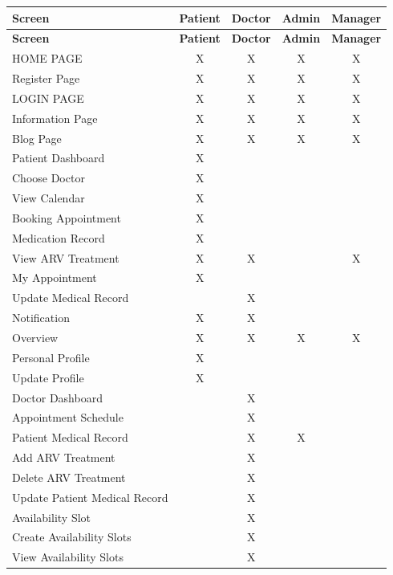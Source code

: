 \documentclass[12pt,a4paper]{article}
\begin{document}
\renewcommand{\arraystretch}{1.4}
\begin{longtable}{|p{5cm}|c|c|c|c|}
\hline
\textbf{Screen} & \textbf{Patient} & \textbf{Doctor} & \textbf{Admin} & \textbf{Manager} \\
\hline
\endfirsthead

\hline
\textbf{Screen} & \textbf{Patient} & \textbf{Doctor} & \textbf{Admin} & \textbf{Manager} \\
\hline
\endhead

HOME PAGE & X & X & X & X \\
\hline
Register Page & X & X & X & X \\
\hline
LOGIN PAGE & X & X & X & X \\
\hline
Information Page & X & X & X & X \\
\hline
Blog Page & X & X & X & X \\
\hline
Patient Dashboard & X &  &  &  \\
\hline
Choose Doctor & X &  &  &  \\
\hline
View Calendar & X &  &  &  \\
\hline
Booking Appointment & X &  &  &  \\
\hline
Medication Record & X &  &  &  \\
\hline
View ARV Treatment & X & X &  & X \\
\hline
My Appointment & X &  &  &  \\
\hline
Update Medical Record &  & X &  &  \\
\hline
Notification & X & X &  &  \\
\hline
Overview & X & X & X & X \\
\hline
Personal Profile & X &  &  &  \\
\hline
Update Profile & X &  &  &  \\
\hline
Doctor Dashboard &  & X &  &  \\
\hline
Appointment Schedule &  & X &  &  \\
\hline
Patient Medical Record &  & X & X &  \\
\hline
Add ARV Treatment &  & X &  &  \\
\hline
Delete ARV Treatment &  & X &  &  \\
\hline
Update Patient Medical Record &  & X &  &  \\
\hline
Availability Slot &  & X &  &  \\
\hline
Create Availability Slots &  & X &  &  \\
\hline
View Availability Slots &  & X &  &  \\

\end{longtable}
\end{document}
